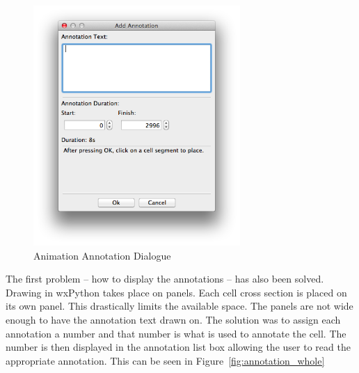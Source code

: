 \begin{figure}[h!]
    \centering
    \includegraphics[width=0.7\textwidth]{images/annotation_dialog.png}
    \caption{Animation Annotation Dialogue}
    \label{fig:annotation_dialog}
\end{figure}

The first problem -- how to display the annotations -- has also been solved.  Drawing in wxPython takes place on panels.  Each cell cross section is placed on its own panel.  This drastically limits the available space.  The panels are not wide enough to have the annotation text drawn on.  The solution was to assign each annotation a number and that number is what is used to annotate the cell.  The number is then displayed in the annotation list box allowing the user to read the appropriate annotation.  This can be seen in Figure~\ref{fig:annotation_whole}

